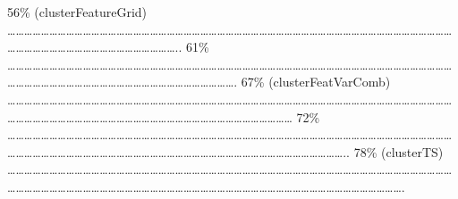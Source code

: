 \documentclass[
]{article}
\begin{document}
\textbar{} 56\% (clusterFeatureGrid) \textbar{}
\textbar\ldots\ldots\ldots\ldots\ldots\ldots\ldots\ldots\ldots\ldots\ldots\ldots\ldots\ldots\ldots\ldots\ldots\ldots\ldots\ldots\ldots\ldots\ldots\ldots\ldots\ldots\ldots\ldots\ldots\ldots\ldots\ldots\ldots\ldots\ldots\ldots\ldots\ldots\ldots\ldots\ldots\ldots\ldots\ldots\ldots\ldots\ldots\ldots\ldots\ldots\ldots\ldots\ldots\ldots\ldots\ldots\ldots\ldots\ldots\ldots\ldots\ldots\ldots\ldots\ldots\ldots\ldots\ldots\ldots\ldots\ldots\ldots\ldots..
\textbar{} 61\% \textbar{}
\textbar\ldots\ldots\ldots\ldots\ldots\ldots\ldots\ldots\ldots\ldots\ldots\ldots\ldots\ldots\ldots\ldots\ldots\ldots\ldots\ldots\ldots\ldots\ldots\ldots\ldots\ldots\ldots\ldots\ldots\ldots\ldots\ldots\ldots\ldots\ldots\ldots\ldots\ldots\ldots\ldots\ldots\ldots\ldots\ldots\ldots\ldots\ldots\ldots\ldots\ldots\ldots\ldots\ldots\ldots\ldots\ldots\ldots\ldots\ldots\ldots\ldots\ldots\ldots\ldots\ldots\ldots\ldots\ldots\ldots\ldots\ldots\ldots\ldots\ldots\ldots\ldots\ldots\ldots\ldots\ldots.
\textbar{} 67\% (clusterFeatVarComb) \textbar{}
\textbar\ldots\ldots\ldots\ldots\ldots\ldots\ldots\ldots\ldots\ldots\ldots\ldots\ldots\ldots\ldots\ldots\ldots\ldots\ldots\ldots\ldots\ldots\ldots\ldots\ldots\ldots\ldots\ldots\ldots\ldots\ldots\ldots\ldots\ldots\ldots\ldots\ldots\ldots\ldots\ldots\ldots\ldots\ldots\ldots\ldots\ldots\ldots\ldots\ldots\ldots\ldots\ldots\ldots\ldots\ldots\ldots\ldots\ldots\ldots\ldots\ldots\ldots\ldots\ldots\ldots\ldots\ldots\ldots\ldots\ldots\ldots\ldots\ldots\ldots\ldots\ldots\ldots\ldots\ldots\ldots\ldots\ldots\ldots\ldots\ldots\ldots\ldots{}
\textbar{} 72\% \textbar{}
\textbar\ldots\ldots\ldots\ldots\ldots\ldots\ldots\ldots\ldots\ldots\ldots\ldots\ldots\ldots\ldots\ldots\ldots\ldots\ldots\ldots\ldots\ldots\ldots\ldots\ldots\ldots\ldots\ldots\ldots\ldots\ldots\ldots\ldots\ldots\ldots\ldots\ldots\ldots\ldots\ldots\ldots\ldots\ldots\ldots\ldots\ldots\ldots\ldots\ldots\ldots\ldots\ldots\ldots\ldots\ldots\ldots\ldots\ldots\ldots\ldots\ldots\ldots\ldots\ldots\ldots\ldots\ldots\ldots\ldots\ldots\ldots\ldots\ldots\ldots\ldots\ldots\ldots\ldots\ldots\ldots\ldots\ldots\ldots\ldots\ldots\ldots\ldots\ldots\ldots\ldots\ldots\ldots\ldots..
\textbar{} 78\% (clusterTS) \textbar{}
\textbar\ldots\ldots\ldots\ldots\ldots\ldots\ldots\ldots\ldots\ldots\ldots\ldots\ldots\ldots\ldots\ldots\ldots\ldots\ldots\ldots\ldots\ldots\ldots\ldots\ldots\ldots\ldots\ldots\ldots\ldots\ldots\ldots\ldots\ldots\ldots\ldots\ldots\ldots\ldots\ldots\ldots\ldots\ldots\ldots\ldots\ldots\ldots\ldots\ldots\ldots\ldots\ldots\ldots\ldots\ldots\ldots\ldots\ldots\ldots\ldots\ldots\ldots\ldots\ldots\ldots\ldots\ldots\ldots\ldots\ldots\ldots\ldots\ldots\ldots\ldots\ldots\ldots\ldots\ldots\ldots\ldots\ldots\ldots\ldots\ldots\ldots\ldots\ldots\ldots\ldots\ldots\ldots\ldots\ldots\ldots\ldots\ldots\ldots\ldots\ldots.
\end{document}
